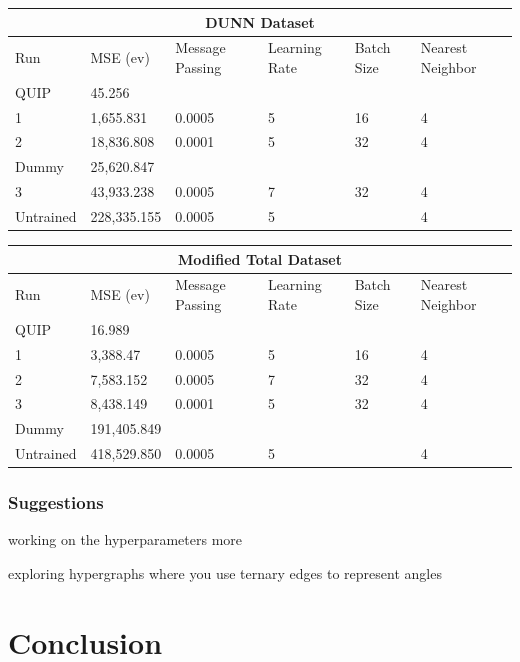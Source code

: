 \documentclass[12pt]{scrartcl}
\begin{document}
\begin{center}
    \begin{tabular}{|p{2cm}||p{2.5cm}|p{2cm}|p{2cm}|p{2cm}|p{2cm}|}
    \hline
    \multicolumn{6}{|c|}{DUNN Dataset} \\
    \hline
    Run  & MSE (ev) & Message Passing & Learning Rate & Batch Size & Nearest Neighbor\\
    \hline
    QUIP   & 45.256 &   &  &  &\\
    1   & 1,655.831 & 0.0005 & 5 & 16 & 4\\
    2 & 18,836.808 & 0.0001 & 5 & 32 & 4\\
    Dummy & 25,620.847 &   &  &  & \\
    3    & 43,933.238 & 0.0005 & 7 & 32 & 4\\
    Untrained & 228,335.155 & 0.0005 & 5 & & 4\\
    \hline
    \end{tabular}
\end{center}

\begin{center}
    \begin{tabular}{|p{2cm}||p{2.5cm}|p{2cm}|p{2cm}|p{2cm}|p{2cm}|}
    \hline
    \multicolumn{6}{|c|}{Modified Total Dataset} \\
    \hline
    Run  & MSE (ev) & Message Passing & Learning Rate & Batch Size & Nearest Neighbor\\
    \hline
    QUIP   & 16.989 &   &  &  &\\
    1   & 3,388.47 & 0.0005 & 5 & 16 & 4\\
    2 & 7,583.152 & 0.0005 & 7 & 32 & 4\\
    3    & 8,438.149 & 0.0001 & 5 & 32 & 4\\
    Dummy & 191,405.849 &   &  &  & \\
    Untrained & 418,529.850 & 0.0005 & 5 & & 4\\
    \hline
    \end{tabular}
\end{center}



\subsubsection{Suggestions} 
working on the hyperparameters more

exploring hypergraphs where you use ternary edges to represent angles
\newpage

\section{Conclusion}

\newpage



\end{document}
